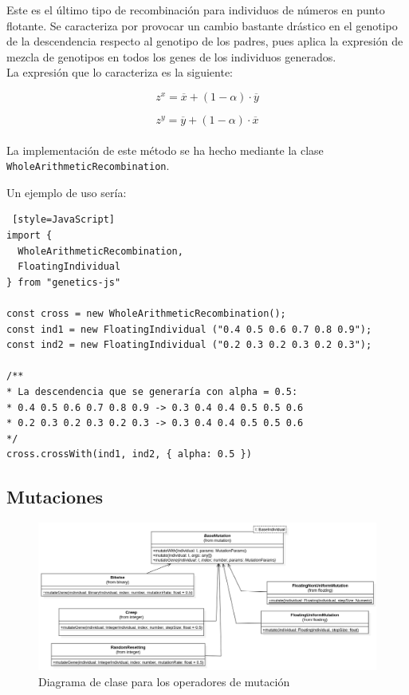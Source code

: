 Este es el último tipo de recombinación para individuos de números en punto flotante. Se caracteriza por provocar un cambio bastante drástico en el genotipo de la descendencia respecto al genotipo de los padres, pues aplica la expresión de mezcla de genotipos en todos los genes de los individuos generados. \\

La expresión que lo caracteriza es la siguiente:

\begin{equation}
    z^x = \overline{x} + (1 - \alpha) \cdot \overline{y}
\end{equation}

\begin{equation}
    z^y = \overline{y} + (1 - \alpha) \cdot \overline{x}
\end{equation}
\\
La implementación de este método se ha hecho mediante la clase \texttt{WholeArithmeticRecombination}. \\

\clearpage

Un ejemplo de uso sería: \\

\begin{lstlisting} [style=JavaScript]
import { 
  WholeArithmeticRecombination, 
  FloatingIndividual 
} from "genetics-js"

const cross = new WholeArithmeticRecombination();
const ind1 = new FloatingIndividual ("0.4 0.5 0.6 0.7 0.8 0.9");
const ind2 = new FloatingIndividual ("0.2 0.3 0.2 0.3 0.2 0.3");

/**
* La descendencia que se generaría con alpha = 0.5:
* 0.4 0.5 0.6 0.7 0.8 0.9 -> 0.3 0.4 0.4 0.5 0.5 0.6
* 0.2 0.3 0.2 0.3 0.2 0.3 -> 0.3 0.4 0.4 0.5 0.5 0.6
*/
cross.crossWith(ind1, ind2, { alpha: 0.5 })
\end{lstlisting}

\subsection{Mutaciones}

\begin{figure}[ht]
    \centering
    \includegraphics[scale=0.3]{mem/images/cap-4/4.2.7(Mutation)/Mutation.png}
    \caption{Diagrama de clase para los operadores de mutación }
    \label{fig:my_label}
\end{figure}

